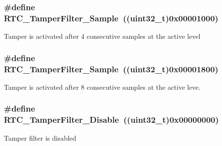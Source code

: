 \subsubsection[{R\+T\+C\+\_\+\+Tamper\+Filter\+\_\+4\+Sample}]{\setlength{\rightskip}{0pt plus 5cm}\#define R\+T\+C\+\_\+\+Tamper\+Filter\+\_\+Sample~((uint32\+\_\+t)0x00001000)}\label{group___r_t_c___tamper___filter___definitions_ga1d36f9a5326a4ed71de0f28365ee65e6}
Tamper is activated after 4 consecutive samples at the active level \hypertarget{group___r_t_c___tamper___filter___definitions_gae84bc688a4eca9fd17ece6df6436c9ca}{}
\subsubsection[{R\+T\+C\+\_\+\+Tamper\+Filter\+\_\+8\+Sample}]{\setlength{\rightskip}{0pt plus 5cm}\#define R\+T\+C\+\_\+\+Tamper\+Filter\+\_\+Sample~((uint32\+\_\+t)0x00001800)}\label{group___r_t_c___tamper___filter___definitions_gae84bc688a4eca9fd17ece6df6436c9ca}
Tamper is activated after 8 consecutive samples at the active leve. \hypertarget{group___r_t_c___tamper___filter___definitions_ga606745baf6ebc29dec3ab8f4af69f9e7}{}
\subsubsection[{R\+T\+C\+\_\+\+Tamper\+Filter\+\_\+\+Disable}]{\setlength{\rightskip}{0pt plus 5cm}\#define R\+T\+C\+\_\+\+Tamper\+Filter\+\_\+\+Disable~((uint32\+\_\+t)0x00000000)}\label{group___r_t_c___tamper___filter___definitions_ga606745baf6ebc29dec3ab8f4af69f9e7}
Tamper filter is disabled 